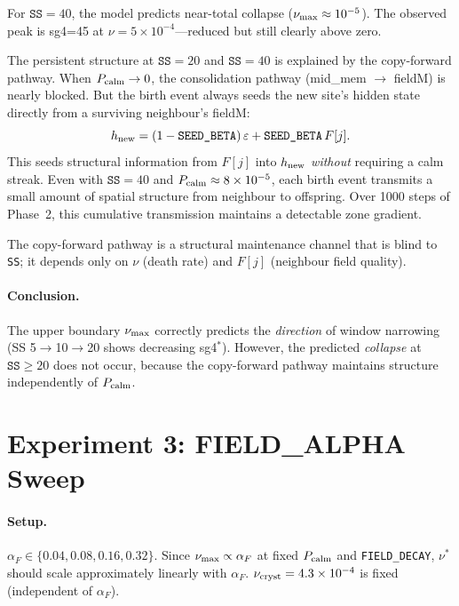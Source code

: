 \documentclass[11pt]{article}
\begin{document}
For $\texttt{SS}=40$, the model predicts near-total collapse
($\nu_{\rm max} \approx 10^{-5}$).
The observed peak is sg4=45 at $\nu = 5\times10^{-4}$---reduced but still
clearly above zero.

The persistent structure at $\texttt{SS}=20$ and $\texttt{SS}=40$ is explained
by the copy-forward pathway.
When $P_{\rm calm} \to 0$, the consolidation pathway (mid\_mem $\to$ fieldM) is
nearly blocked.
But the birth event always seeds the new site's hidden state directly from a
surviving neighbour's fieldM:
\[
  h_{\rm new} = (1-\texttt{SEED\_BETA})\,\varepsilon
                + \texttt{SEED\_BETA}\,F[j].
\]
This seeds structural information from $F[j]$ into $h_{\rm new}$ \emph{without}
requiring a calm streak.
Even with $\texttt{SS}=40$ and $P_{\rm calm} \approx 8\times10^{-5}$, each birth
event transmits a small amount of spatial structure from neighbour to offspring.
Over 1000 steps of Phase~2, this cumulative transmission maintains a detectable
zone gradient.

The copy-forward pathway is a structural maintenance channel that is blind to
\texttt{SS}; it depends only on $\nu$ (death rate) and $F[j]$ (neighbour field quality).

\paragraph{Conclusion.}
The upper boundary $\nu_{\rm max}$ correctly predicts the \emph{direction} of
window narrowing (SS 5$\to$10$\to$20 shows decreasing sg4$^*$).
However, the predicted \emph{collapse} at $\texttt{SS}\geq20$ does not occur,
because the copy-forward pathway maintains structure independently of $P_{\rm calm}$.

\section{Experiment 3: FIELD\_ALPHA Sweep}

\paragraph{Setup.}
$\alpha_F \in \{0.04, 0.08, 0.16, 0.32\}$.
Since $\nu_{\rm max} \propto \alpha_F$ at fixed $P_{\rm calm}$ and
\texttt{FIELD\_DECAY}, $\nu^*$ should scale approximately linearly with $\alpha_F$.
$\nu_{\rm cryst}=4.3\times10^{-4}$ is fixed (independent of $\alpha_F$).
\end{document}
